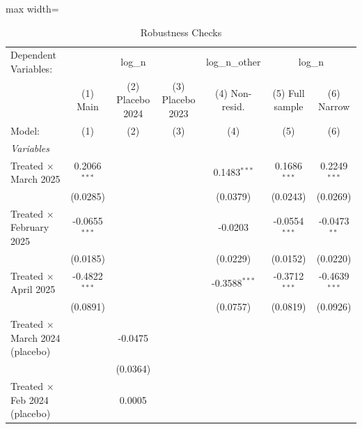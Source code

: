 \begin{table}[htbp]
   \caption{\label{tab:robust} Robustness Checks}
   \centering
   \begin{adjustbox}{max width=\textwidth}
   \begin{tabular}{lcccccc}
      \tabularnewline \midrule \midrule
      Dependent Variables: & \multicolumn{3}{c}{log\_n} & log\_n\_other & \multicolumn{2}{c}{log\_n}\\
                                             & (1) Main        & (2) Placebo 2024 & (3) Placebo 2023 & (4) Non-resid.  & (5) Full sample & (6) Narrow \\   
      Model:                                 & (1)             & (2)              & (3)              & (4)             & (5)             & (6)\\  
      \midrule
      \emph{Variables}\\
      Treated $\times$ March 2025            & 0.2066$^{***}$  &                  &                  & 0.1483$^{***}$  & 0.1686$^{***}$  & 0.2249$^{***}$\\   
                                             & (0.0285)        &                  &                  & (0.0379)        & (0.0243)        & (0.0269)\\   
      Treated $\times$ February 2025         & -0.0655$^{***}$ &                  &                  & -0.0203         & -0.0554$^{***}$ & -0.0473$^{**}$\\   
                                             & (0.0185)        &                  &                  & (0.0229)        & (0.0152)        & (0.0220)\\   
      Treated $\times$ April 2025            & -0.4822$^{***}$ &                  &                  & -0.3588$^{***}$ & -0.3712$^{***}$ & -0.4639$^{***}$\\   
                                             & (0.0891)        &                  &                  & (0.0757)        & (0.0819)        & (0.0926)\\   
      Treated $\times$ March 2024 (placebo)  &                 & -0.0475          &                  &                 &                 &   \\   
                                             &                 & (0.0364)         &                  &                 &                 &   \\   
      Treated $\times$ Feb 2024 (placebo)    &                 & 0.0005           &                  &                 &                 &   \\   

\end{tabular}
\end{adjustbox}
\end{table}
